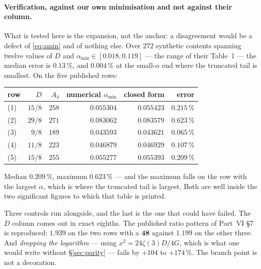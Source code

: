 \documentclass[11pt,a4paper]{article}
\newcommand{\rep}[1]{\mathbf{#1}}
\newcommand{\amin}{\alpha_{\min}}
\begin{document}
\paragraph{Verification, against our own minimisation and not against their column.} What is tested
here is the expansion, not the anchor: a disagreement would be a defect of \eqref{eq:amin} and of
nothing else. Over $272$ synthetic contents spanning twelve values of $D$ and
$\amin\in[0.018,0.119]$ --- the range of their Table~1 --- the median error is $0.13\,\%$, and
$0.004\,\%$ at the small-$\alpha$ end where the truncated tail is smallest. On the five
published rows:

\begin{center}\small
{}
\begin{tabular}{lrrrrr}
\toprule
\rowcolor{hdrblue!10}row & $D$ & $A_4$ & numerical $\amin$ & closed form & error\\
\midrule
(1) & $15/8$ & $258$ & $0.055304$ & $0.055423$ & $0.215\,\%$\\
\rowcolor{amber!12}(2) & $29/8$ & $271$ & $0.083062$ & $0.083579$ & $0.623\,\%$\\
(3) & $9/8$  & $189$ & $0.043593$ & $0.043621$ & $0.065\,\%$\\
(4) & $11/8$ & $223$ & $0.046879$ & $0.046929$ & $0.107\,\%$\\
(5) & $15/8$ & $255$ & $0.055277$ & $0.055393$ & $0.209\,\%$\\
\bottomrule
\end{tabular}
\end{center}

\noindent Median $0.209\,\%$, maximum $0.623\,\%$ --- and the maximum falls on the row with the
largest $\alpha$, which is where the truncated tail is largest. Both are well
inside the two significant figures to which that table is printed.

Three controls run alongside, and the last is the one that could have failed. The $D$ column comes
out in exact eighths. The published ratio pattern of Part~VI \S7 is reproduced: $1.939$ on the two
rows with a $\rep{48}$ against $1.199$ on the other three. And \emph{dropping the logarithm} ---
using $x^2=24\zeta(3)D/4G$, which is what one would write without \S\ref{sec:parity} --- fails by
$+104$ to $+174\,\%$. The branch point is not a decoration.
\end{document}
